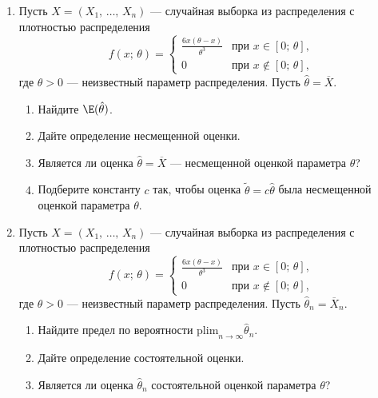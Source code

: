 \begin{enumerate}
\item
Пусть $X = (X_1, \, \ldots, \, X_n)$ — случайная выборка из распределения с плотностью распределения
\[
    f(x; \, \theta) = \left\{
                        \begin{array}{ll}
                          \frac{6x(\theta - x)}{\theta^3} & \text{при $x \in [0; \, \theta]$,} \\
                          0 & \text{при $x \not\in [0; \, \theta]$,}
                        \end{array}
                      \right.
\]
где $\theta > 0$ — неизвестный параметр распределения. Пусть $\hat{\theta} = \overline{X}$.
\begin{enumerate}
  \item Найдите $\E(\hat{\theta})$.
  \item Дайте определение несмещенной оценки.
  \item Является ли оценка $\hat{\theta} = \overline{X}$ — несмещенной оценкой параметра $\theta$?
  \item Подберите константу $c$ так, чтобы оценка $\widetilde{\theta} = c \hat{\theta}$ была несмещенной оценкой параметра $\theta$.
\end{enumerate}

\item
Пусть $X = (X_1, \, \ldots, \, X_n)$ — случайная выборка из распределения с плотностью распределения
\[
    f(x; \, \theta) = \left\{
                        \begin{array}{ll}
                          \frac{6x(\theta - x)}{\theta^3} & \text{при $x \in [0; \, \theta]$,} \\
                          0 & \text{при $x \not\in [0; \, \theta]$,}
                        \end{array}
                      \right.
\]
где $\theta > 0$ — неизвестный параметр распределения. Пусть $\hat{\theta}_n = \overline{X}_n$.
\begin{enumerate}
  \item Найдите предел по вероятности $\mathrm{plim}_{n \rightarrow \infty}\hat{\theta}_n$.
  \item Дайте определение состоятельной оценки.
  \item Является ли оценка $\hat{\theta}_n$ состоятельной оценкой параметра $\theta$?
\end{enumerate}


\end{enumerate}
